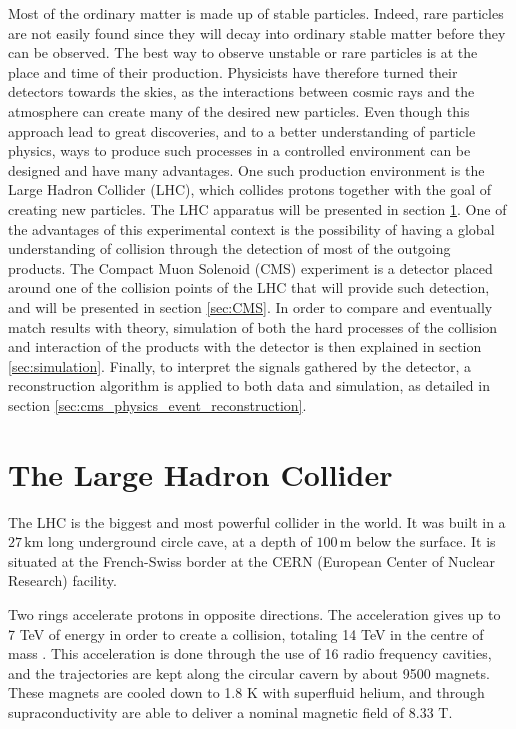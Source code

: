 
Most of the ordinary matter is made up of stable particles. Indeed, rare particles are not easily found since they will decay into ordinary stable matter before they can be observed. The best way to observe unstable or rare particles is at the place and time of their production. Physicists have therefore turned their detectors towards the skies, as the interactions between cosmic rays and the atmosphere can create many of the desired new particles. Even though this approach lead to great discoveries, and to a better understanding of particle physics, ways to produce such processes in a controlled environment can be designed and have many advantages. One such production environment is the Large Hadron Collider (LHC), which collides protons together with the goal of creating new particles. The LHC apparatus will be presented in section \ref{sec:LHC}. One of the advantages of this experimental context is the possibility of having a global understanding of collision through the detection of most of the outgoing products. The Compact Muon Solenoid (CMS) experiment is a detector placed around one of the collision points of the LHC that will provide such detection, and will be presented in section \ref{sec:CMS}. In order to compare and eventually match results with theory, simulation of both the hard processes of the collision and interaction of the products with the detector is then explained in section \ref{sec:simulation}. Finally, to interpret the signals gathered by the detector, a reconstruction algorithm is applied to both data and simulation, as detailed in section \ref{sec:cms_physics_event_reconstruction}.

\section{The Large Hadron Collider}
\label{sec:LHC}

The LHC is the biggest and most powerful collider in the world. It was built in a $27\,\mathrm{km}$ long underground circle cave, at a depth of $100\,\mathrm{m}$ below the surface. It is situated at the French-Swiss border at the CERN (European Center of Nuclear Research) facility.

Two rings accelerate protons in opposite directions. The acceleration gives up to 7 TeV of energy in order to create a collision, totaling 14 TeV in the centre of mass \cite{Bruning:782076,Bruning:815187,Benedikt:823808}. This acceleration is done through the use of 16 radio frequency cavities, and the trajectories are kept along the circular cavern by about 9500 magnets. These magnets are cooled down to 1.8 K with superfluid helium, and through supraconductivity are able to deliver a nominal magnetic field of 8.33 T.

